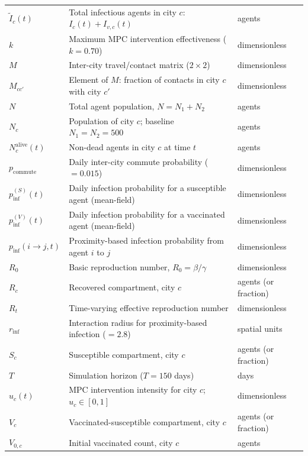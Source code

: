 \begin{tabular}{@{}lll@{}}
$\tilde{I}_c(t)$ & Total infectious agents in city $c$: $I_c(t)+I_{v,c}(t)$  & agents \\
$k$         & Maximum MPC intervention effectiveness ($k=0.70$)              & dimensionless \\
$M$         & Inter-city travel/contact matrix ($2\times2$)                   & dimensionless \\
$M_{cc'}$   & Element of $M$: fraction of contacts in city $c$ with city $c'$ & dimensionless \\
$N$         & Total agent population, $N = N_1 + N_2$                         & agents \\
$N_c$       & Population of city $c$; baseline $N_1=N_2=500$                  & agents \\
$N_c^{\mathrm{alive}}(t)$ & Non-dead agents in city $c$ at time $t$          & agents \\
$p_{\mathrm{commute}}$ & Daily inter-city commute probability ($=0.015$)       & dimensionless \\
$p_{\mathrm{inf}}^{(S)}(t)$ & Daily infection probability for a susceptible agent (mean-field) & dimensionless \\
$p_{\mathrm{inf}}^{(V)}(t)$ & Daily infection probability for a vaccinated agent (mean-field)  & dimensionless \\
$p_{\mathrm{inf}}(i\!\to\!j,t)$ & Proximity-based infection probability from agent $i$ to $j$ & dimensionless \\
$R_0$       & Basic reproduction number, $R_0 = \beta/\gamma$                 & dimensionless \\
$R_c$       & Recovered compartment, city $c$                                 & agents (or fraction) \\
$R_t$       & Time-varying effective reproduction number                       & dimensionless \\
$r_{\mathrm{inf}}$ & Interaction radius for proximity-based infection ($=2.8$)   & spatial units \\
$S_c$       & Susceptible compartment, city $c$                               & agents (or fraction) \\
$T$         & Simulation horizon ($T=150$ days)                               & days \\
$u_c(t)$    & MPC intervention intensity for city $c$; $u_c\in[0,1]$         & dimensionless \\
$V_c$       & Vaccinated-susceptible compartment, city $c$                    & agents (or fraction) \\
$V_{0,c}$   & Initial vaccinated count, city $c$                              & agents \\
\bottomrule
\end{tabular}

